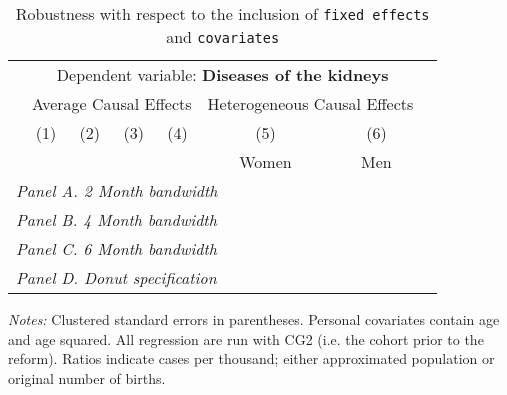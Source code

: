  \begin{table}[H] \begin{threeparttable} \centering \caption{Robustness with respect to the inclusion of \texttt{fixed effects} and \texttt{covariates}} {\def\sym#1{\ifmmode^{#1}\else\(^{#1}\)\fi} \begin{tabular}{l*{7}{c}} \toprule & \multicolumn{6}{c}{Dependent variable: \textbf{Diseases of the kidneys}} \\ \cmidrule(lr){2-7}
            &\multicolumn{4}{c}{Average Causal Effects}         &\multicolumn{2}{c}{Heterogeneous Causal Effects}\\\cmidrule(lr){2-5}\cmidrule(lr){6-7}
            &\multicolumn{1}{c}{(1)}&\multicolumn{1}{c}{(2)}&\multicolumn{1}{c}{(3)}&\multicolumn{1}{c}{(4)}&\multicolumn{1}{c}{(5)}&\multicolumn{1}{c}{(6)}\\
            &\multicolumn{1}{c}{}&\multicolumn{1}{c}{}&\multicolumn{1}{c}{}&\multicolumn{1}{c}{}&\multicolumn{1}{c}{Women}&\multicolumn{1}{c}{Men}\\
\midrule
 \multicolumn{7}{l}{\emph{Panel A. 2 Month bandwidth}} \\    \midrule\multicolumn{7}{l}{\emph{Panel B. 4 Month bandwidth}} \\    \midrule\multicolumn{7}{l}{\emph{Panel C. 6 Month bandwidth}} \\    \midrule\multicolumn{7}{l}{\emph{Panel D. Donut specification}} \\    \midrule  
\bottomrule \end{tabular} } \begin{tablenotes} \item \scriptsize \emph{Notes:} Clustered standard errors in parentheses. Personal covariates contain age and age squared. All regression are run with CG2 (i.e. the cohort prior to the reform). Ratios indicate cases per thousand; either approximated population or original number of births. \end{tablenotes} \end{threeparttable} \end{table} 

